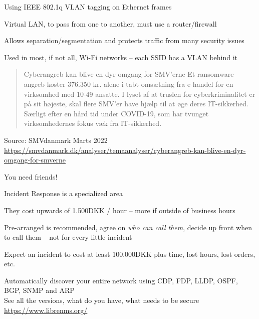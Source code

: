 \documentclass[Screen16to9,17pt]{foils}
\begin{document}


\begin{list1}
\item Using IEEE 802.1q  VLAN tagging on Ethernet frames
\item Virtual LAN, to pass from one to another, must use a router/firewall
\item Allows separation/segmentation and protects traffic from many security issues
\item Used in most, if not all, Wi-Fi networks -- each SSID has a VLAN behind it
\end{list1}




\begin{quote}
Cyberangreb kan blive en dyr omgang for SMV’erne
Et ransomware angreb koster 376.350 kr. alene i tabt omsætning fra e-handel for en virksomhed med 10-49 ansatte. I lyset af at truslen for cyberkriminalitet er på sit højeste, skal flere SMV’er have hjælp til at øge deres IT-sikkerhed. Særligt efter en hård tid under COVID-19, som har tvunget virksomhedernes fokus væk fra IT-sikkerhed.
\end{quote}
Source: SMVdanmark Marts 2022 \url{https://smvdanmark.dk/analyser/temaanalyser/cyberangreb-kan-blive-en-dyr-omgang-for-smverne}

\begin{list2}
\item You need friends!

\item Incident Response is a specialized area

\item They cost upwards of 1.500DKK / hour -- more if outside of business hours
\item Pre-arranged is recommended, agree on \emph{who can call them}, decide up front when to call them -- not for every little incident
\item Expect an incident to cost at least 100.000DKK plus time, lost hours, lost orders, etc.
\end{list2}




Automatically discover your entire network using CDP, FDP, LLDP, OSPF, BGP, SNMP and ARP \\
See all the versions, what do you have, what needs to be secure \url{https://www.librenms.org/}
\end{document}
